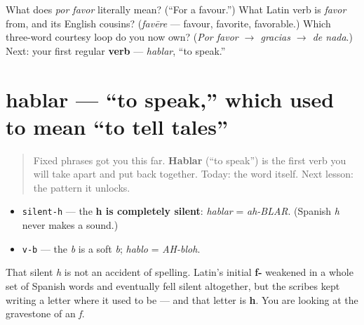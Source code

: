 \begin{tcolorbox}[breakable,colback=teal!4,colframe=teal!35!black,title={Before you move on}]
What does \emph{por favor} literally mean? (\textquotedblleft{}For a favour.\textquotedblright{}) What Latin verb is \emph{favor} from, and its English cousins? (\emph{favēre} — favour, favorite, favorable.) Which three-word courtesy loop do you now own? (\emph{Por favor $\to$ gracias $\to$ de nada}.) Next: your first regular \textbf{verb} — \emph{hablar}, “to speak.”
\end{tcolorbox}
\section[hablar]{hablar — \textquotedblleft{}to speak,\textquotedblright{} which used to mean \textquotedblleft{}to tell tales\textquotedblright{}}

\label{lesson:ES-C06-hablar}



\begin{quote}
Fixed phrases got you this far. \textbf{Hablar} (\textquotedblleft{}to speak\textquotedblright{}) is the first verb you will take apart and put back together. Today: the word itself. Next lesson: the pattern it unlocks.
\end{quote}

\begin{sounds}
\begin{itemize}
\raggedright
  \item \texttt{silent-h} — the \textbf{h is completely silent}: \emph{hablar} = \emph{ah-BLAR}. (Spanish \emph{h} never makes a sound.)
  \item \texttt{v-b} — the \emph{b} is a soft \emph{b}; \emph{hablo} = \emph{AH-bloh}.
\end{itemize}

That silent \emph{h} is not an accident of spelling. Latin's initial \textbf{f-} weakened in a whole set of Spanish words and eventually fell silent altogether, but the scribes kept writing a letter where it used to be — and that letter is \textbf{h}. You are looking at the gravestone of an \emph{f}.
\end{sounds}

